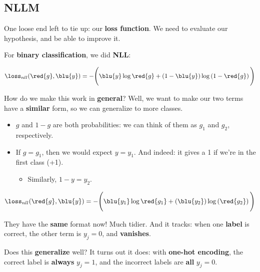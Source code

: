     \subsection*{NLLM}
    
        One loose end left to tie up: our \textbf{loss function}. We need to evaluate our hypothesis, and be able to improve it.
        
        For \textbf{binary classification}, we did \textbf{NLL}:
    
        \begin{equation*}
            \loss_{nll}
            (\red{g} , \blu{y})
            =
            -
            \Bigg(
                \blu{y} \log{\red{g}}
                +
                \left( 1 - \blu{y} \right)
                \log
                \left( 1-\red{g} \right) 
            \Bigg)
        \end{equation*}
        
        How do we make this work in \textbf{general}? Well, we want to make our two terms have a \textbf{similar} form, so we can generalize to more classes.
        
        \begin{itemize}
            \item $g$ and $1-g$ are both probabilities: we can think of them as $g_1$ and $g_2$, respectively.
            \item If $g=g_1$, then we would expect $y=y_1$. And indeed: it gives a 1 if we're in the first class (+1).
                \begin{itemize}
                    \item Similarly, $1-y=y_2$.
                \end{itemize}
        \end{itemize}
        
        \begin{equation*}
            \loss_{nll}
            (\red{g} , \blu{y})
            =
            -
            \Bigg(
                \blu{y_1} \log{\red{g_1}}
                +
                \left( \blu{y_2} \right)
                \log
                \left( \red{g_2} \right) 
            \Bigg)
        \end{equation*}
        
        They have the \textbf{same} format now! Much tidier. And it tracks: when one \textbf{label} is correct, the other term is $y_j=0$, and \textbf{vanishes}.
        
        Does this \textbf{generalize} well? It turns out it does: with \textbf{one-hot encoding}, the correct label is \textbf{always} $y_j=1$, and the incorrect labels are \textbf{all} $y_j=0$. 
        
